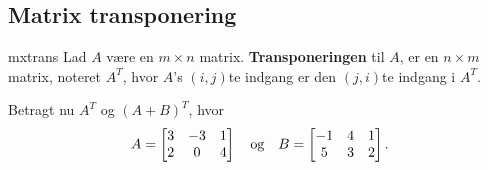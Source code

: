 \subsection{Matrix transponering}
\begin{defn}{}{mxtrans}
Lad $A$ være en $m \times n$ matrix. \textbf{Transponeringen} til $A$, er en $n \times m$ matrix, noteret $A^T$, hvor $A$'s $(i,j)$te indgang er den $(j,i)$te indgang i $A^T$.
\end{defn}
\begin{eks}
Betragt nu $A^T$ og $(A+B)^T$, hvor 
\begin{align*}
A= 
\begin{bmatrix}
3	&	-3	&	1\\
2	&	0	&	4
\end{bmatrix}
\text{\phantom{---}og\phantom{---}}
B= 
\begin{bmatrix}
-1	&	4	&	1\\
5	&	3	&	2
\end{bmatrix}.
\end{align*}

\end{eks}